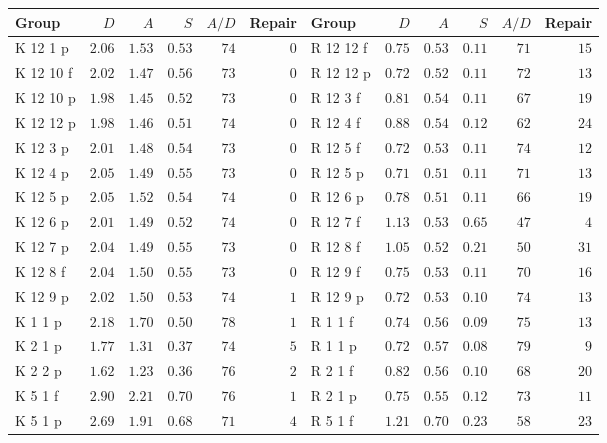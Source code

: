 \begin{tabular}{@{}lrrrrr@{\hspace{14pt}}lrrrrr@{}}
\toprule
Group & $D$ & $A$ & $S$ & $A/D$ & Repair & Group & $D$ & $A$ & $S$ & $A/D$ & Repair \\
\midrule
K 12 1 p & $2.06$ & $1.53$ & $0.53$ & $74$ & $0$ & R 12 12 f & $0.75$ & $0.53$ & $0.11$ & $71$ & $15$ \\
K 12 10 f & $2.02$ & $1.47$ & $0.56$ & $73$ & $0$ & R 12 12 p & $0.72$ & $0.52$ & $0.11$ & $72$ & $13$ \\
K 12 10 p & $1.98$ & $1.45$ & $0.52$ & $73$ & $0$ & R 12 3 f & $0.81$ & $0.54$ & $0.11$ & $67$ & $19$ \\
K 12 12 p & $1.98$ & $1.46$ & $0.51$ & $74$ & $0$ & R 12 4 f & $0.88$ & $0.54$ & $0.12$ & $62$ & $24$ \\
K 12 3 p & $2.01$ & $1.48$ & $0.54$ & $73$ & $0$ & R 12 5 f & $0.72$ & $0.53$ & $0.11$ & $74$ & $12$ \\
K 12 4 p & $2.05$ & $1.49$ & $0.55$ & $73$ & $0$ & R 12 5 p & $0.71$ & $0.51$ & $0.11$ & $71$ & $13$ \\
K 12 5 p & $2.05$ & $1.52$ & $0.54$ & $74$ & $0$ & R 12 6 p & $0.78$ & $0.51$ & $0.11$ & $66$ & $19$ \\
K 12 6 p & $2.01$ & $1.49$ & $0.52$ & $74$ & $0$ & R 12 7 f & $1.13$ & $0.53$ & $0.65$ & $47$ & $4$ \\
K 12 7 p & $2.04$ & $1.49$ & $0.55$ & $73$ & $0$ & R 12 8 f & $1.05$ & $0.52$ & $0.21$ & $50$ & $31$ \\
K 12 8 f & $2.04$ & $1.50$ & $0.55$ & $73$ & $0$ & R 12 9 f & $0.75$ & $0.53$ & $0.11$ & $70$ & $16$ \\
K 12 9 p & $2.02$ & $1.50$ & $0.53$ & $74$ & $1$ & R 12 9 p & $0.72$ & $0.53$ & $0.10$ & $74$ & $13$ \\
K 1 1 p & $2.18$ & $1.70$ & $0.50$ & $78$ & $1$ & R 1 1 f & $0.74$ & $0.56$ & $0.09$ & $75$ & $13$ \\
K 2 1 p & $1.77$ & $1.31$ & $0.37$ & $74$ & $5$ & R 1 1 p & $0.72$ & $0.57$ & $0.08$ & $79$ & $9$ \\
K 2 2 p & $1.62$ & $1.23$ & $0.36$ & $76$ & $2$ & R 2 1 f & $0.82$ & $0.56$ & $0.10$ & $68$ & $20$ \\
K 5 1 f & $2.90$ & $2.21$ & $0.70$ & $76$ & $1$ & R 2 1 p & $0.75$ & $0.55$ & $0.12$ & $73$ & $11$ \\
K 5 1 p & $2.69$ & $1.91$ & $0.68$ & $71$ & $4$ & R 5 1 f & $1.21$ & $0.70$ & $0.23$ & $58$ & $23$ \\

\end{tabular}
